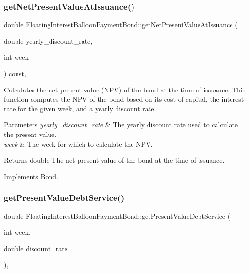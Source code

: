 \subsubsection{\texorpdfstring{get\+Net\+Present\+Value\+At\+Issuance()}{getNetPresentValueAtIssuance()}}
{\footnotesize\ttfamily double Floating\+Interest\+Balloon\+Payment\+Bond\+::get\+Net\+Present\+Value\+At\+Issuance (\begin{DoxyParamCaption}\item[{double}]{yearly\+\_\+discount\+\_\+rate,  }\item[{int}]{week }\end{DoxyParamCaption}) const\hspace{0.3cm}{\ttfamily [override]}, {\ttfamily [virtual]}}



Calculates the net present value (N\+PV) of the bond at the time of issuance. This function computes the N\+PV of the bond based on its cost of capital, the interest rate for the given week, and a yearly discount rate. 


\begin{DoxyParams}{Parameters}
{\em yearly\+\_\+discount\+\_\+rate} & The yearly discount rate used to calculate the present value. \\
\hline
{\em week} & The week for which to calculate the N\+PV.\\
\hline
\end{DoxyParams}
\begin{DoxyReturn}{Returns}
double The net present value of the bond at the time of issuance. 
\end{DoxyReturn}


Implements \mbox{\hyperlink{classBond_a5997278813deb16aa5d01bbca8ecc7b2}{Bond}}.

\mbox{\label{classFloatingInterestBalloonPaymentBond_a91b2fef92f90049a3ba13bcd27c0eff2}} 
\subsubsection{\texorpdfstring{get\+Present\+Value\+Debt\+Service()}{getPresentValueDebtService()}}
{\footnotesize\ttfamily double Floating\+Interest\+Balloon\+Payment\+Bond\+::get\+Present\+Value\+Debt\+Service (\begin{DoxyParamCaption}\item[{int}]{week,  }\item[{double}]{discount\+\_\+rate }\end{DoxyParamCaption})\hspace{0.3cm}{\ttfamily [override]}, {\ttfamily [virtual]}}



